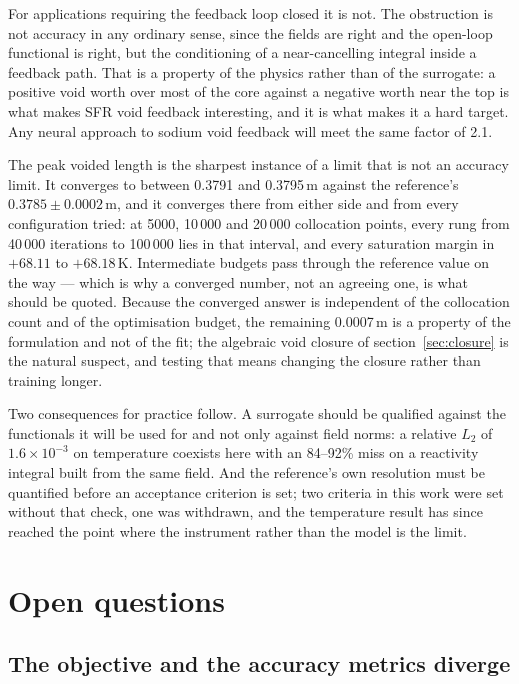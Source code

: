 \documentclass[11pt,a4paper]{article}
\begin{document}
For applications requiring the feedback loop closed it is not. The obstruction is not
accuracy in any ordinary sense, since the fields are right and the open-loop functional is
right, but the conditioning of a near-cancelling integral inside a feedback path. That is a
property of the physics rather than of the surrogate: a positive void worth over most of
the core against a negative worth near the top is what makes SFR void feedback interesting,
and it is what makes it a hard target. Any neural approach to sodium void feedback will meet
the same factor of 2.1.

The peak voided length is the sharpest instance of a limit that is not an accuracy limit.
It converges to between 0.3791 and 0.3795\,m against the reference's
$0.3785 \pm 0.0002$\,m, and it converges there from either side and from every
configuration tried: at 5000, 10\,000 and 20\,000 collocation points, every rung from
40\,000 iterations to 100\,000 lies in that interval, and every saturation margin in
$+68.11$ to $+68.18$\,K. Intermediate budgets pass through the
reference value on the way --- which is why a converged number, not an agreeing one, is what
should be quoted. Because the converged answer is independent of the collocation count and
of the optimisation budget, the remaining 0.0007\,m is a property of the formulation and not
of the fit; the algebraic void closure of section~\ref{sec:closure} is the natural
suspect, and testing that means changing the closure rather than training longer.

Two consequences for practice follow. A surrogate should be qualified against the
functionals it will be used for and not only against field norms: a relative $L_2$ of
$1.6\times10^{-3}$ on temperature coexists here with an 84--92\% miss on a reactivity
integral built from the same field. And the reference's own resolution must be quantified
before an acceptance criterion is set; two criteria in this work were set without that
check, one was withdrawn, and the temperature result has since reached the point where the
instrument rather than the model is the limit.

\section{Open questions}\label{sec:open}

\subsection{The objective and the accuracy metrics diverge}
\end{document}
